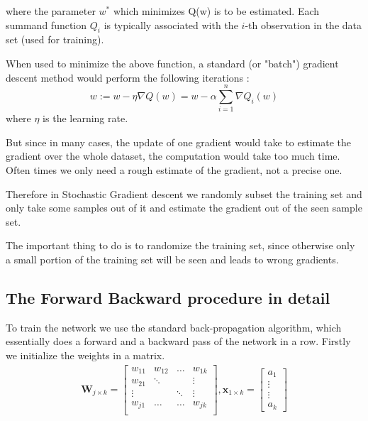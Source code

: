 where the parameter $w^*$ which minimizes Q(w) is to be estimated. Each summand function $Q_i$ is typically associated with the $i$-th observation in the data set (used for training).

When used to minimize the above function, a standard (or "batch") gradient descent method would perform the following iterations :
\begin{equation}
w := w - \eta \nabla Q(w) = w - \alpha \sum_{i=1}^n \nabla Q_i(w)
\end{equation}
where $\eta$ is the learning rate.

But since in many cases, the update of one gradient would take to estimate the gradient over the whole dataset, the computation would take too much time. Often times we only need a rough estimate of the gradient, not a precise one.

Therefore in Stochastic Gradient descent we randomly subset the training set and only take some samples out of it and estimate the gradient out of the seen sample set.

The important thing to do is to randomize the training set, since otherwise only a small portion of the training set will be seen and leads to wrong gradients.

\subsection{The Forward Backward procedure in detail}

To train the network we use the standard back-propagation algorithm, which essentially does a forward and a backward pass of the network in a row.
Firstly we initialize the weights in a matrix. 
\begin{align}
\mathbf{W}_{j \times k } = \begin{bmatrix}
w_{11} & w_{12} & \ldots & w_{1k}\\
w_{21} & \ddots & & \vdots\\
\vdots & & \ddots  & \vdots\\
w_{j1} & \ldots & \ldots  & w_{jk}\\
\end{bmatrix},
\mathbf{x}_{1 \times k} = \begin{bmatrix}
a_{1} \\
\vdots\\
\vdots \\
a_{k}
\end{bmatrix}
\end{align}


